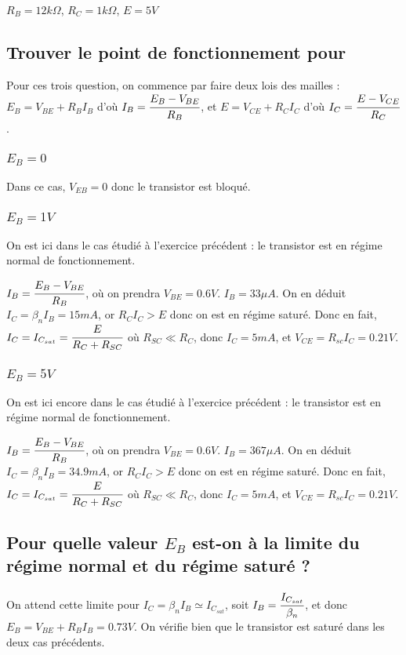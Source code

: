 \documentclass[10pt]{article}
\begin{document}
  $R_B=12k\Omega$, $R_C = 1k\Omega$, $E=5V$

  \subsection{Trouver le point de fonctionnement pour}
   Pour ces trois question, on commence par faire deux lois des mailles : $E_B = V_{BE} + R_B I_B$ d'où $I_B = \cfrac{E_B -V_{BE}}{R_B}$, et $E=V_{CE} + R_C I_C$ d'où $I_C = \cfrac{E-V_{CE}}{R_C}$.
   \subsubsection{$E_B=0$}

    Dans ce cas, $V_{EB} = 0$ donc le transistor est bloqué.

   \subsubsection{$E_B=1V$}

    On est ici dans le cas étudié à l'exercice précédent : le transistor est en régime normal de fonctionnement.

    $I_B = \cfrac{E_B-V_{BE}}{R_B}$, où on prendra $V_{BE} = 0.6V$. $I_B = 33\mu A$. On en déduit $I_C = \beta_n I_B = 15mA$, or $R_C I_C > E$ donc on est en régime saturé. Donc en fait, $I_C = I_{C_{sat}} = \cfrac{E}{R_C+R_{SC}}$ où $R_{SC} \ll R_C$, donc $I_C = 5mA$, et $V_{CE} = R_{sc} I_C = 0.21V$.

   \subsubsection{$E_B=5V$}

    On est ici encore dans le cas étudié à l'exercice précédent : le transistor est en régime normal de fonctionnement.

    $I_B = \cfrac{E_B-V_{BE}}{R_B}$, où on prendra $V_{BE} = 0.6V$. $I_B = 367\mu A$. On en déduit $I_C = \beta_n I_B = 34.9mA$, or $R_C I_C > E$ donc on est en régime saturé. Donc en fait, $I_C = I_{C_{sat}} = \cfrac{E}{R_C+R_{SC}}$ où $R_{SC} \ll R_C$, donc $I_C = 5mA$, et $V_{CE} = R_{sc} I_C = 0.21V$.

  \subsection{Pour quelle valeur $E_B$ est-on à la limite du régime normal et du régime saturé ?}

   On attend cette limite pour $I_C = \beta_n I_B \simeq I_{C_{sat}}$, soit $I_B = \cfrac{I_{C_{sat}}}{\beta_n}$, et donc $E_B = V_{BE} +R_B I_B = 0.73V$. On vérifie bien que le transistor est saturé dans les deux cas précédents.
\end{document}
